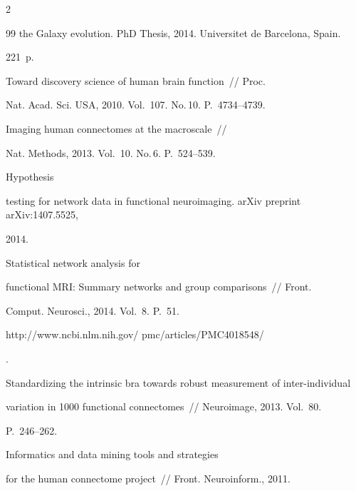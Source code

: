 \begin{multicols}{2}
{{\begin{thebibliography}{99}
the Galaxy evolution. PhD Thesis, 2014. Universitet de Barcelona, Spain.


221~p.




 Toward discovery science of human brain function~// Proc.


Nat. Acad. Sci. USA, 2010.  Vol.~107. No.\,10. P.~4734--4739.




 Imaging human connectomes at the macroscale~//


Nat. Methods, 2013. Vol.~10. No.\,6. P.~524--539.




 Hypothesis


testing for network data in functional neuroimaging. arXiv preprint arXiv:1407.5525,


2014.




 Statistical network analysis for


functional MRI: Summary networks and group comparisons~// Front.


Comput. Neurosci., 2014. Vol.~8. P.~51.


{\sf


http://www.ncbi.nlm.nih.gov/ pmc/articles/PMC4018548/}.






Standardizing the intrinsic bra towards robust measurement of inter-individual


variation in 1000 functional connectomes~// Neuroimage, 2013. Vol.~80.


P.~246--262.




 Informatics and data mining tools and strategies


for the human connectome project~// Front. Neuroinform., 2011.



\end{thebibliography}}}
\end{multicols}
